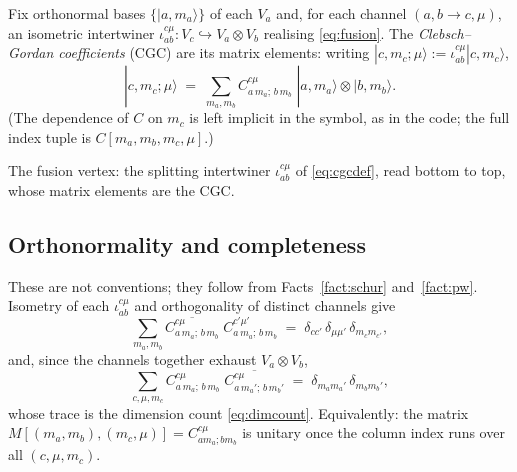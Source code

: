 \documentclass[11pt,a4paper]{article}
\theoremstyle{plain}
\theoremstyle{definition}
\newcommand{\fvert}[2]{\node[fvertex] at (#1) {};%
  \node[fleg, right=1pt] at (#1) {$#2$};}
\begin{document}
Fix orthonormal bases $\{|a,m_a\rangle\}$ of each $V_a$ and, for each channel
$(a,b\to c,\mu)$, an isometric intertwiner
$\iota^{c\mu}_{ab}: V_c \hookrightarrow V_a\otimes V_b$ realising
\eqref{eq:fusion}. The \emph{Clebsch--Gordan coefficients} (CGC) are its matrix
elements: writing $|c,m_c;\mu\rangle := \iota^{c\mu}_{ab}|c,m_c\rangle$,
\begin{equation}\label{eq:cgcdef}
  |c,m_c;\mu\rangle \;=\; \sum_{m_a,m_b}
    C^{c\mu}_{a\,m_a;\,b\,m_b}\;
    |a,m_a\rangle \otimes |b,m_b\rangle .
\end{equation}
(The dependence of $C$ on $m_c$ is left implicit in the symbol, as in the code;
the full index tuple is $C[m_a,m_b,m_c,\mu]$.)

\begin{center}

\smallskip
{\small The fusion vertex: the splitting intertwiner $\iota^{c\mu}_{ab}$ of
\eqref{eq:cgcdef}, read bottom to top, whose matrix elements are the CGC.}
\end{center}

\subsection{Orthonormality and completeness}

These are not conventions; they follow from Facts~\ref{fact:schur}
and~\ref{fact:pw}. Isometry of each $\iota^{c\mu}_{ab}$ and orthogonality of
distinct channels give
\begin{equation}\label{eq:ortho}
  \sum_{m_a,m_b}
    \overline{C^{c\mu}_{a\,m_a;\,b\,m_b}}\;
    C^{c'\mu'}_{a\,m_a;\,b\,m_b}
  \;=\; \delta_{cc'}\,\delta_{\mu\mu'}\,\delta_{m_c m_{c'}} ,
\end{equation}
and, since the channels together exhaust $V_a\otimes V_b$,
\begin{equation}\label{eq:complete}
  \sum_{c,\mu,m_c}
    C^{c\mu}_{a\,m_a;\,b\,m_b}\;
    \overline{C^{c\mu}_{a\,m_a';\,b\,m_b'}}
  \;=\; \delta_{m_a m_a'}\,\delta_{m_b m_b'} ,
\end{equation}
whose trace is the dimension count \eqref{eq:dimcount}. Equivalently: the
matrix $M[(m_a,m_b),(m_c,\mu)] = C^{c\mu}_{a m_a; b m_b}$ is unitary once the
column index runs over all $(c,\mu,m_c)$.
\end{document}
